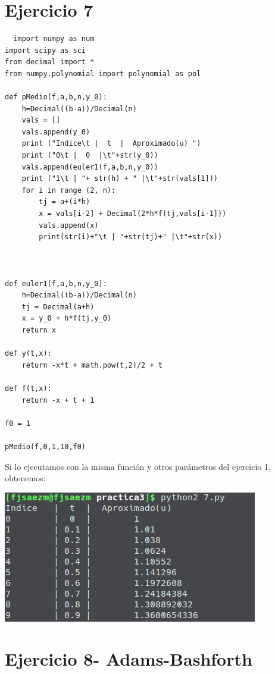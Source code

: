 \documentclass[11pt]{article}
\begin{document}
\section{Ejercicio 7}
\begin{lstlisting}
  import numpy as num
import scipy as sci
from decimal import *
from numpy.polynomial import polynomial as pol

def pMedio(f,a,b,n,y_0):
    h=Decimal((b-a))/Decimal(n)
    vals = []
    vals.append(y_0)
    print ("Indice\t |  t  |  Aproximado(u) ")
    print ("0\t |  0  |\t"+str(y_0))
    vals.append(euler1(f,a,b,n,y_0))
    print ("1\t | "+ str(h) + " |\t"+str(vals[1]))
    for i in range (2, n):
        tj = a+(i*h)
        x = vals[i-2] + Decimal(2*h*f(tj,vals[i-1]))
        vals.append(x)
        print(str(i)+"\t | "+str(tj)+" |\t"+str(x))



def euler1(f,a,b,n,y_0):
    h=Decimal((b-a))/Decimal(n)
    tj = Decimal(a+h)
    x = y_0 + h*f(tj,y_0)
    return x

def y(t,x):
	return -x*t + math.pow(t,2)/2 + t

def f(t,x):
    return -x + t + 1

f0 = 1

pMedio(f,0,1,10,f0)
\end{lstlisting}
Si lo ejecutamos con la misma función y otros parámetros del ejercicio 1, obtenemos:
\begin{center}
  \includegraphics[scale=0.8]{7.png}
\end{center}

\section{Ejercicio 8- Adams-Bashforth}
\end{document}
